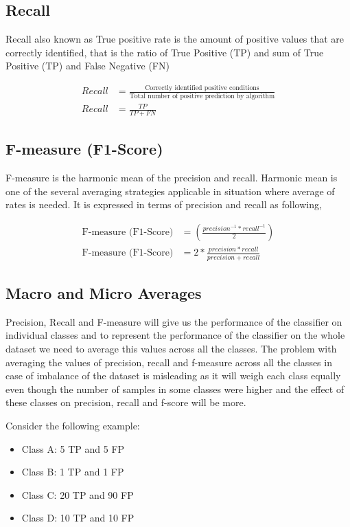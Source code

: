 \subsection*{Recall}
Recall also known as True positive rate is the amount of positive values that are correctly identified, that is the ratio of True Positive (TP) and sum of True Positive (TP) and False Negative (FN)

\begin{align}
    Recall &= \frac{\text{Correctly identified positive conditions}}{\text{Total number of positive prediction by algorithm}}\\
    Recall &= \frac{TP}{TP+FN}
\end{align}

\subsection*{F-measure (F1-Score)}
F-measure is the harmonic mean of the precision and recall. Harmonic mean is one of the several averaging strategies applicable in situation where average of rates is needed. It is expressed in terms of precision and recall as following,

\begin{align}
    \text{F-measure (F1-Score)} &= \left (\frac{precision^{-1} * recall^{-1}}{2}  \right ) \\
    \text{F-measure (F1-Score)} &= 2 * \frac{precision * recall}{precision + recall}
\end{align}

\subsection*{Macro and Micro Averages}

Precision, Recall and F-measure will give us the performance of the classifier on individual classes and to represent the performance of the classifier on the whole dataset we need to average this values across all the classes. The problem with averaging the values of precision, recall and f-measure across all the classes in case of imbalance of the dataset is misleading as it will weigh each class equally even though the number of samples in some classes were higher and the effect of these classes on precision, recall and f-score will be more. 

Consider the following example:
\begin{itemize}
    \item Class A: 5 TP and 5 FP
    \item Class B: 1 TP and 1 FP
    \item Class C: 20 TP and 90 FP
    \item Class D: 10 TP and 10 FP
\end{itemize}


